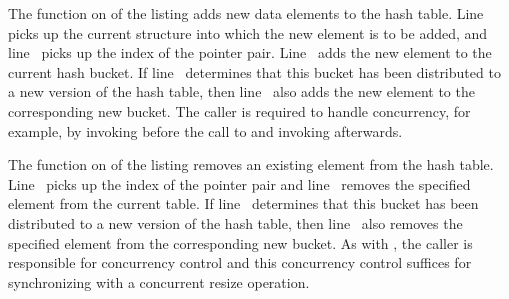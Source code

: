 \QuickQuizEnd

\begin{fcvref}
The  function on  of the listing adds
new data elements to the hash table.
Line~ picks up the current  structure into which the
new element is to be added, and line~ picks up the index of
the pointer pair.
Line~ adds the new element to the current hash bucket.
If line~ determines that this bucket has been distributed
to a new version of the hash table, then line~ also adds the
new element to the corresponding new bucket.
The caller is required to handle concurrency, for example, by invoking
 before the call to  and invoking
 afterwards.
\end{fcvref}

\begin{fcvref}
The  function on
 of the listing removes
an existing element from the hash table.
Line~ picks up the index of the pointer pair
and line~ removes the specified element from the current table.
If line~ determines that this bucket has been distributed
to a new version of the hash table, then line~ also removes
the specified element from the corresponding new bucket.
As with , the caller is responsible for concurrency
control and this concurrency control suffices for synchronizing with
a concurrent resize operation.
\end{fcvref}

